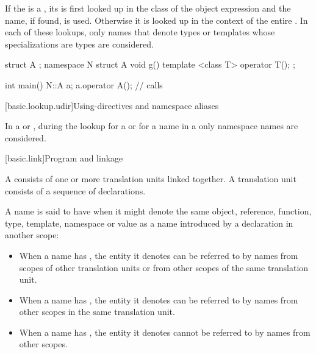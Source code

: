 \pnum
If the  is a ,
its 
is first looked up
in the class of the object expression
and the name, if
found, is used. Otherwise it is looked up in the context
of the entire .
In each of these lookups, only names that denote types or templates whose
specializations are types are considered.
\begin{example}
\begin{codeblock}
struct A { };
namespace N {
  struct A {
    void g() { }
    template <class T> operator T();
  };
}

int main() {
  N::A a;
  a.operator A();               // calls 
}
\end{codeblock}
\end{example}

[basic.lookup.udir]{Using-directives and namespace aliases}

\pnum
{}%
%
In a  or ,
during the lookup for a  or for a name in a
only namespace names are considered.%
%

[basic.link]{Program and linkage}%

\pnum
{}%
A  consists of one or more translation units
linked together. A translation unit consists
of a sequence of declarations.

\begin{bnf}
\br
\end{bnf}

\pnum
{}%
%
%
%
A name is said to have  when it might denote the same
object, reference, function, type, template, namespace or value as a
name introduced by a declaration in another scope:
\begin{itemize}
\item When a name has ,
the entity it denotes
can be referred to by names from scopes of other translation units or
from other scopes of the same translation unit.

\item When a name has ,
the entity it denotes
can be referred to by names from other scopes in the same translation
unit.

\item When a name has , the entity it denotes
cannot be referred to by names from other scopes.
\end{itemize}

